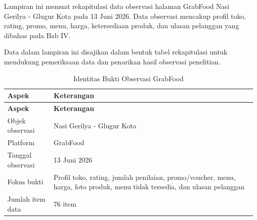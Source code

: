 \label{app:evidence-observasi-grabfood-20260613}

Lampiran ini memuat rekapitulasi data observasi halaman GrabFood Nasi Gerilya - Glugur Kota pada 13 Juni 2026. Data observasi mencakup profil toko, rating, promo, menu, harga, ketersediaan produk, dan ulasan pelanggan yang dibahas pada Bab IV.

Data dalam lampiran ini disajikan dalam bentuk tabel rekapitulasi untuk mendukung pemeriksaan data dan penarikan hasil observasi penelitian.

\begingroup
\begin{xltabular}{\textwidth}{|Z{3.4cm}|Y|}
\caption{Identitas Bukti Observasi GrabFood}
\label{tab:identitas-evidence-observasi-grabfood-20260613} \\
        \toprule
        \textbf{Aspek} & \textbf{Keterangan} \\ \hline
        \midrule
        \endfirsthead
        \toprule
        \textbf{Aspek} & \textbf{Keterangan} \\ \hline
        \midrule
        \endhead
        \endfoot
        \bottomrule
        \endlastfoot
        Objek observasi & Nasi Gerilya - Glugur Kota \\ \hline
        Platform & GrabFood \\ \hline
        Tanggal observasi & 13 Juni 2026 \\ \hline
        Fokus bukti & Profil toko, rating, jumlah penilaian, promo/voucher, menu, harga, foto produk, menu tidak tersedia, dan ulasan pelanggan \\ \hline
        Jumlah item data & 76 item \\ \hline
        \bottomrule
    
\end{xltabular}
\endgroup

